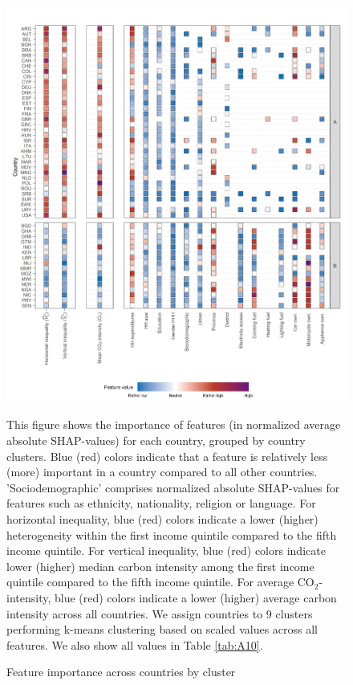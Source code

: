 \documentclass[12pt, a4paper]{article}
\newenvironment{subcaption2}
{\strut
\vspace{-5pt}
\begin{minipage}[b]{0.9\textwidth}
  \hspace*{-\parindent}
  \footnotesize}
 {\end{minipage}}
\begin{document}
\begin{figure}[ht!]
    \centering
    \includegraphics{1_Figures/Figure 4/Figure_4_Corrected_1.jpg}
    \caption{Feature importance across countries by cluster}
    \label{fig:fig_4_1}
    \begin{subcaption2}
    This figure shows the importance of features (in normalized average absolute SHAP-values) for each country, grouped by country clusters. Blue (red) colors indicate that a feature is relatively less (more) important in a country compared to all other countries. 'Sociodemographic' comprises normalized absolute SHAP-values for features such as ethnicity, nationality, religion or language.
    For horizontal inequality, blue (red) colors indicate a lower (higher) heterogeneity within the first income quintile compared to the fifth income quintile. For vertical inequality, blue (red) colors indicate lower (higher) median carbon intensity among the first income quintile compared to the fifth income quintile. For average CO$_{2}$-intensity, blue (red) colors indicate a lower (higher) average carbon intensity across all countries.
    We assign countries to 9 clusters performing k-means clustering based on scaled values across all features. We also show all values in Table \ref{tab:A10}.
    \end{subcaption2}
\end{figure}
\end{document}
